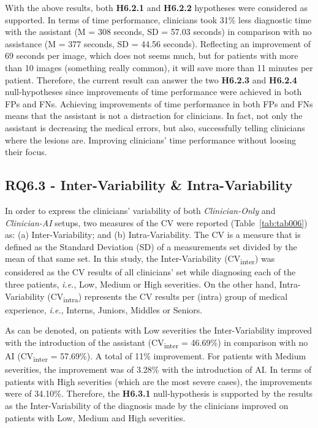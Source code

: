 With the above results, both {\bf H6.2.1} and {\bf H6.2.2} hypotheses were considered as supported.
In terms of time performance, clinicians took 31\% less diagnostic time with the assistant (M = 308 seconds, SD = 57.03 seconds) in comparison with no assistance (M = 377 seconds, SD = 44.56 seconds).
Reflecting an improvement of 69 seconds per image, which does not seems much, but for patients with more than 10 images (something really common), it will save more than 11 minutes per patient.
Therefore, the current result can answer the two {\bf H6.2.3} and {\bf H6.2.4} null-hypotheses since improvements of time performance were achieved in both \acp{FP} and \acp{FN}.
Achieving improvements of time performance in both \acp{FP} and \acp{FN} means that the assistant is not a distraction for clinicians.
In fact, not only the assistant is decreasing the medical errors, but also, successfully telling clinicians where the lesions are.
Improving clinicians' time performance without loosing their focus.

\subsection{RQ6.3 - Inter-Variability \& Intra-Variability}
\label{sec:sec006006003}

In order to express the clinicians' variability of both {\it Clinician-Only} and {\it Clinician-AI} setups, two measures of the \acf{CV} were reported (Table~\ref{tab:tab006}) as:
(a) Inter-Variability; and
(b) Intra-Variability.
The \ac{CV} is a measure that is defined as the Standard Deviation (SD) of a measurements set divided by the mean of that same set.
In this study, the Inter-Variability (CV\textsubscript{inter}) was considered as the \ac{CV} results of all clinicians' set while diagnosing each of the three patients, {\it i.e.}, Low, Medium or High severities.
On the other hand, Intra-Variability (CV\textsubscript{intra}) represents the \ac{CV} results per (intra) group of medical experience, {\it i.e.}, Interns, Juniors, Middles or Seniors.



As can be denoted, on patients with Low severities the Inter-Variability improved with the introduction of the assistant (CV\textsubscript{inter} = 46.69\%) in comparison with no \ac{AI} (CV\textsubscript{inter} = 57.69\%).
A total of 11\% improvement.
For patients with Medium severities, the improvement was of 3.28\% with the introduction of \ac{AI}.
In terms of patients with High severities (which are the most severe cases), the improvements were of 34.10\%.
Therefore, the {\bf H6.3.1} null-hypothesis is supported by the results as the Inter-Variability of the diagnosis made by the clinicians improved on patients with Low, Medium and High severities.

